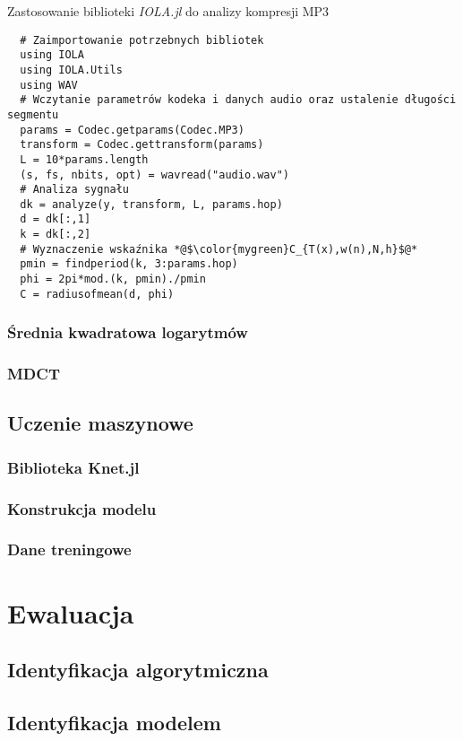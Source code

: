 \documentclass[pl,12pt]{aghdpl}
\let\Oldchapter\chapter%
\renewcommand{\chapter}{\FloatBarrier\Oldchapter}
\let\Oldsection\section%
\renewcommand{\section}{\FloatBarrier\Oldsection}
\let\Oldsubsection\subsection%
\renewcommand{\subsection}{\FloatBarrier\Oldsubsection}
\begin{document}
\begin{program}
  \caption{Zastosowanie biblioteki \textit{IOLA.jl} do analizy kompresji MP3}
  \label{lst:IOLA_example}
  \begin{lstlisting}
  # Zaimportowanie potrzebnych bibliotek
  using IOLA
  using IOLA.Utils
  using WAV
  # Wczytanie parametrów kodeka i danych audio oraz ustalenie długości segmentu
  params = Codec.getparams(Codec.MP3)
  transform = Codec.gettransform(params)
  L = 10*params.length
  (s, fs, nbits, opt) = wavread("audio.wav")
  # Analiza sygnału
  dk = analyze(y, transform, L, params.hop)
  d = dk[:,1]
  k = dk[:,2]
  # Wyznaczenie wskaźnika *@$\color{mygreen}C_{T(x),w(n),N,h}$@*
  pmin = findperiod(k, 3:params.hop)
  phi = 2pi*mod.(k, pmin)./pmin
  C = radiusofmean(d, phi)
  \end{lstlisting}
\end{program}
\subsection{Średnia kwadratowa logarytmów}
\subsection{MDCT}
\section{Uczenie maszynowe}
\subsection{Biblioteka Knet.jl}
\subsection{Konstrukcja modelu}
\subsection{Dane treningowe}
\chapter{Ewaluacja}
\section{Identyfikacja algorytmiczna}
\section{Identyfikacja modelem}
\end{document}
